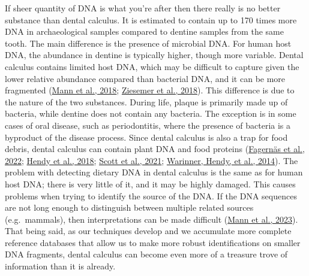 \documentclass[
  b5paper,
]{book}
\begin{document}
If sheer quantity of DNA is what you're after then there really is no
better substance than dental calculus. It is estimated to contain up to
170 times more DNA in archaeological samples compared to dentine samples
from the same tooth. The main difference is the presence of microbial
DNA. For human host DNA, the abundance in dentine is typically higher,
though more variable. Dental calculus contains limited host DNA, which
may be difficult to capture given the lower relative abundance compared
than bacterial DNA, and it can be more fragmented
(\protect\hyperlink{ref-mannDifferentialPreservation2018}{Mann et al.,
2018}; \protect\hyperlink{ref-ziesemerGenomeCalculus2018}{Ziesemer et
al., 2018}). This difference is due to the nature of the two substances.
During life, plaque is primarily made up of bacteria, while dentine does
not contain any bacteria. The exception is in some cases of oral
disease, such as periodontitis, where the presence of bacteria is a
byproduct of the disease process. Since dental calculus is also a trap
for food debris, dental calculus can contain plant DNA and food proteins
(\protect\hyperlink{ref-fagernasMicrobialBiogeography2022}{Fagernäs et
al., 2022}; \protect\hyperlink{ref-hendyProteomicCalculus2018}{Hendy et
al., 2018}; \protect\hyperlink{ref-scottExoticFoods2021}{Scott et al.,
2021}; \protect\hyperlink{ref-warinnerEvidenceMilk2014}{Warinner, Hendy,
et al., 2014}). The problem with detecting dietary DNA in dental
calculus is the same as for human host DNA; there is very little of it,
and it may be highly damaged. This causes problems when trying to
identify the source of the DNA. If the DNA sequences are not long enough
to distinguish between multiple related sources (e.g.~mammals), then
interpretations can be made difficult
(\protect\hyperlink{ref-mannHaveSomething2023}{Mann et al., 2023}). That
being said, as our techniques develop and we accumulate more complete
reference databases that allow us to make more robust identifications on
smaller DNA fragments, dental calculus can become even more of a
treasure trove of information than it is already.
\end{document}
